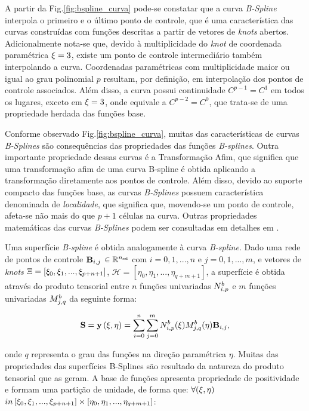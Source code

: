 \documentclass[tese_patricia]{subfiles}
\begin{document}
A partir da Fig.\ref{fig:bspline_curva} pode-se constatar que a curva \textit{B-Spline} interpola o primeiro e o último ponto de controle, que é uma característica das curvas construídas com funções descritas a partir de vetores de \textit{knots} abertos. Adicionalmente nota-se que, devido à multiplicidade do \textit{knot} de coordenada paramétrica $\xi=3$, existe um ponto de controle intermediário também interpolando a curva. 
Coordenadas paramétricas com multiplicidade maior ou igual ao grau polinomial $p$ resultam, por definição, em interpolação dos pontos de controle associados.
Além disso, a curva possui continuidade $C^{p-1} = C^{1}$ em todos os lugares, exceto em $\xi = 3$, onde equivale a $C^{p-2} = C^{0}$, que trata-se de uma propriedade herdada das funções base.

Conforme observado  Fig.\ref{fig:bspline_curva}, muitas das características de curvas \textit{B-Splines} são consequências das propriedades das funções \textit{B-splines}. Outra importante propriedade dessas curvas é a Transformação Afim, que significa que uma transformação afim de uma curva B-spline é obtida aplicando a transformação diretamente aos pontos de controle. Além disso, devido ao suporte compacto das funções base, as curvas \textit{B-Splines} possuem característica denominada de \textit{localidade}, que significa que, movendo-se um ponto de controle, afeta-se não mais do que $p+1$ células na curva. Outras propriedades matemáticas das curvas \textit{B-Splines} podem ser consultadas em detalhes em .

Uma superfície \textit{B-spline} é obtida analogamente à curva \textit{B-spline}. Dado uma rede de pontos de controle $\mathbf{B}_{i,j}$ $\in \mathbb{R}^{{n_{\mathrm{sd}}}}$ com $i = 0,1,...,n$ e $j = 0,1,..., m$, e vetores de \textit{knots} $\Xi = \left[\xi_{0},\xi_{1},...,\xi_{p+n+1}\right]$, $\mathcal{H} = \left[\eta_{0},\eta_{1},...,\eta_{q+m+1}\right]$, a superfície é obtida através do produto tensorial entre $n$ funções univariadas $N^b_{i,p}$ e $m$ funções univariadas $M^b_{j,q}$ da seguinte forma:

\begin{align}
\mathbf{S} = \mathbf{y}\left(\xi,\eta\right)  = \sum_{i=0}^{n}\sum_{j=0}^{m}N^b_{i,p}(\xi)M^b_{j,q}(\eta)\mathbf{B}_{i,j},
\end{align}

\noindent onde $q$ representa o grau das funções na direção paramétrica $\eta$. 
Muitas das propriedades das superfícies B-Splines são resultado da natureza do produto tensorial que as geram. A base de funções apresenta propriedade de positividade e formam uma partição de unidade, de forma que: $\forall(\xi,\eta)$ $in \left[\xi_{0},\xi_{1},...,\xi_{p+n+1}\right] \times  \left[\eta_{0},\eta_{1},...,\eta_{q+m+1}\right]$:
\end{document}

